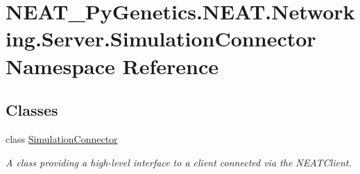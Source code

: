 \hypertarget{namespaceNEAT__PyGenetics_1_1NEAT_1_1Networking_1_1Server_1_1SimulationConnector}{}\section{N\+E\+A\+T\+\_\+\+Py\+Genetics.\+N\+E\+A\+T.\+Networking.\+Server.\+Simulation\+Connector Namespace Reference}
\label{namespaceNEAT__PyGenetics_1_1NEAT_1_1Networking_1_1Server_1_1SimulationConnector}
\subsection*{Classes}
\begin{DoxyCompactItemize}
\item 
class \hyperlink{classNEAT__PyGenetics_1_1NEAT_1_1Networking_1_1Server_1_1SimulationConnector_1_1SimulationConnector}{Simulation\+Connector}
\begin{DoxyCompactList}\small\item\em A class providing a high-\/level interface to a client connected via the N\+E\+A\+T\+Client. \end{DoxyCompactList}\end{DoxyCompactItemize}
